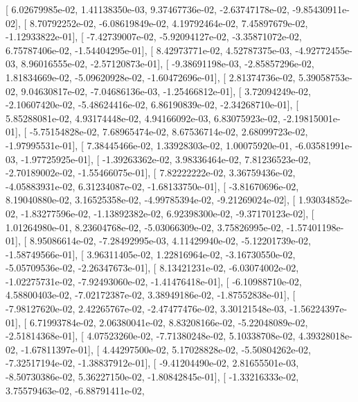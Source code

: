 \documentclass{article}
\begin{document}
       [  6.02679985e-02,   1.41138350e-03,   9.37467736e-02,
         -2.63747178e-02,  -9.85430911e-02],
       [  8.70792252e-02,  -6.08619849e-02,   4.19792464e-02,
          7.45897679e-02,  -1.12933822e-01],
       [ -7.42739007e-02,  -5.92094127e-02,  -3.35871072e-02,
          6.75787406e-02,  -1.54404295e-01],
       [  8.42973771e-02,   4.52787375e-03,  -4.92772455e-03,
          8.96016555e-02,  -2.57120873e-01],
       [ -9.38691198e-03,  -2.85857296e-02,   1.81834669e-02,
         -5.09620928e-02,  -1.60472696e-01],
       [  2.81374736e-02,   5.39058753e-02,   9.04630817e-02,
         -7.04686136e-03,  -1.25466812e-01],
       [  3.72094249e-02,  -2.10607420e-02,  -5.48624416e-02,
          6.86190839e-02,  -2.34268710e-01],
       [  5.85288081e-02,   4.93174448e-02,   4.94166092e-03,
          6.83075923e-02,  -2.19815001e-01],
       [ -5.75154828e-02,   7.68965474e-02,   8.67536714e-02,
          2.68099723e-02,  -1.97995531e-01],
       [  7.38445466e-02,   1.33928303e-02,   1.00075920e-01,
         -6.03581991e-03,  -1.97725925e-01],
       [ -1.39263362e-02,   3.98336464e-02,   7.81236523e-02,
         -2.70189002e-02,  -1.55466075e-01],
       [  7.82222222e-02,   3.36759436e-02,  -4.05883931e-02,
          6.31234087e-02,  -1.68133750e-01],
       [ -3.81670696e-02,   8.19040880e-02,   3.16525358e-02,
         -4.99785394e-02,  -9.21269024e-02],
       [  1.93034852e-02,  -1.83277596e-02,  -1.13892382e-02,
          6.92398300e-02,  -9.37170123e-02],
       [  1.01264980e-01,   8.23604768e-02,  -5.03066309e-02,
          3.75826995e-02,  -1.57401198e-01],
       [  8.95086614e-02,  -7.28492995e-03,   4.11429940e-02,
         -5.12201739e-02,  -1.58749566e-01],
       [  3.96311405e-02,   1.22816964e-02,  -3.16730550e-02,
         -5.05709536e-02,  -2.26347673e-01],
       [  8.13421231e-02,  -6.03074002e-02,  -1.02275731e-02,
         -7.92493060e-02,  -1.41476418e-01],
       [ -6.10988710e-02,   4.58800403e-02,  -7.02172387e-02,
          3.38949186e-02,  -1.87552838e-01],
       [ -7.98127620e-02,   2.42265767e-02,  -2.47477476e-02,
          3.30121548e-03,  -1.56224397e-01],
       [  6.71993784e-02,   2.06380041e-02,   8.83208166e-02,
         -5.22048089e-02,  -2.51814368e-01],
       [  4.07523260e-02,  -7.71380248e-02,   5.10338708e-02,
          4.39328018e-02,  -1.67811397e-01],
       [  4.44297500e-02,   5.17028828e-02,  -5.50804262e-02,
         -7.32517194e-02,  -1.38837912e-01],
       [ -9.41204490e-02,   2.81655501e-03,  -8.50730386e-02,
          5.36227150e-02,  -1.80842845e-01],
       [ -1.33216333e-02,   3.75579463e-02,  -6.88791411e-02,
\end{document}
